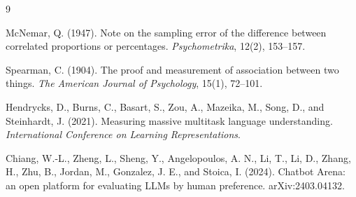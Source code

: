 \begin{thebibliography}{9}

McNemar, Q. (1947).
Note on the sampling error of the difference between correlated proportions or percentages.
\emph{Psychometrika}, 12(2), 153--157.

Spearman, C. (1904).
The proof and measurement of association between two things.
\emph{The American Journal of Psychology}, 15(1), 72--101.

Hendrycks, D., Burns, C., Basart, S., Zou, A., Mazeika, M., Song, D., and Steinhardt, J. (2021).
Measuring massive multitask language understanding.
\emph{International Conference on Learning Representations}.

Chiang, W.-L., Zheng, L., Sheng, Y., Angelopoulos, A. N., Li, T., Li, D., Zhang, H., Zhu, B., Jordan, M., Gonzalez, J. E., and Stoica, I. (2024).
Chatbot Arena: an open platform for evaluating LLMs by human preference.
arXiv:2403.04132.

\end{thebibliography}

